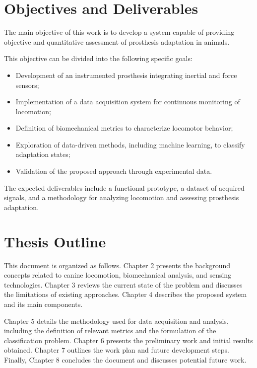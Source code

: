 \section{Objectives and Deliverables}

The main objective of this work is to develop a system capable of providing objective and quantitative assessment of prosthesis adaptation in animals.

This objective can be divided into the following specific goals:

\begin{itemize}
    \item Development of an instrumented prosthesis integrating inertial and force sensors;
    \item Implementation of a data acquisition system for continuous monitoring of locomotion;
    \item Definition of biomechanical metrics to characterize locomotor behavior;
    \item Exploration of data-driven methods, including machine learning, to classify adaptation states;
    \item Validation of the proposed approach through experimental data.
\end{itemize}

The expected deliverables include a functional prototype, a dataset of acquired signals, and a methodology for analyzing locomotion and assessing prosthesis adaptation.

\section{Thesis Outline}

This document is organized as follows. Chapter 2 presents the background concepts related to canine locomotion, biomechanical analysis, and sensing technologies. Chapter 3 reviews the current state of the problem and discusses the limitations of existing approaches. Chapter 4 describes the proposed system and its main components.

Chapter 5 details the methodology used for data acquisition and analysis, including the definition of relevant metrics and the formulation of the classification problem. Chapter 6 presents the preliminary work and initial results obtained. Chapter 7 outlines the work plan and future development steps. Finally, Chapter 8 concludes the document and discusses potential future work.